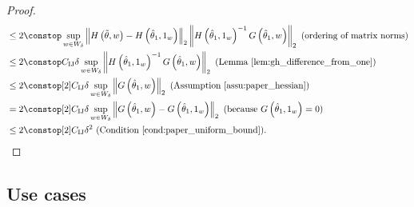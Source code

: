 \begin{proof}
\begin{align*}
 & \le2\constop\sup_{w\in W_{\delta}}\norm{H\left(\thetawiggle,w\right)-H\left(\thetaone,\onevec\right)}_{2}\norm{H\left(\thetaone,\onevec\right)^{-1}G\left(\thetaone,w\right)}_{2}\textrm{ (ordering of matrix norms)}\\
 & \le2\constop\constij\delta\sup_{w\in W_{\delta}}\norm{H\left(\thetaone,\onevec\right)^{-1}G\left(\thetaone,w\right)}_{2}\textrm{ (Lemma \ref{lem:gh_difference_from_one})}\\
 & \le2\constop[2]\constij\delta\sup_{w\in W_{\delta}}\norm{G\left(\thetaone,w\right)}_{2}\textrm{ (Assumption \ref{assu:paper_hessian})}\\
 & =2\constop[2]\constij\delta\sup_{w\in W_{\delta}}\norm{G\left(\thetaone,w\right)-G\left(\thetaone,\onevec\right)}_{2}\textrm{ (because }G\left(\thetaone,\onevec\right)=0\textrm{)}\\
 & \le2\constop[2]\constij\delta^{2}\textrm{ (Condition \ref{cond:paper_uniform_bound})}.
\end{align*}
\end{proof}
%






\subsection{Use cases\label{sec:use_cases}}

